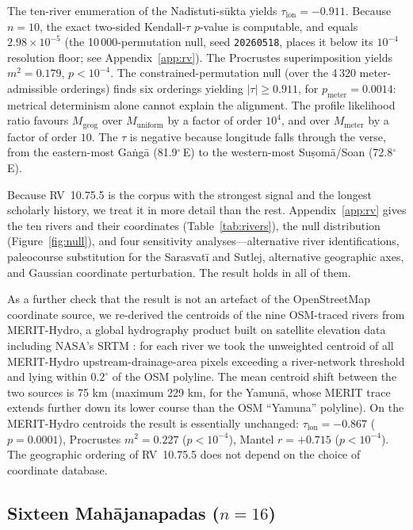 \documentclass[11pt]{article}
\begin{document}
The ten-river enumeration of the Nadīstuti-sūkta yields
$\tau_\text{lon} = -0.911$. Because $n=10$, the exact two-sided
Kendall-$\tau$ $p$-value is computable, and equals
$2.98\times10^{-5}$ (the 10\,000-permutation null, seed
\texttt{20260518}, places it below its $10^{-4}$ resolution
floor; see Appendix~\ref{app:rv}). The Procrustes
superimposition yields $m^2 = 0.179$, $p < 10^{-4}$. The
constrained-permutation null (over the 4\,320 meter-admissible
orderings) finds six orderings yielding $|\tau| \geq 0.911$, for
$p_\text{meter} = 0.0014$: metrical determinism alone cannot
explain the alignment. The profile likelihood ratio favours
$M_\text{geog}$ over $M_\text{uniform}$ by a factor of order $10^4$,
and over $M_\text{meter}$ by a factor of order $10$. The $\tau$ is negative because
longitude falls through the verse, from the eastern-most Ga\.{n}g\={a}
(81.9$^\circ$\,E) to the western-most Su\d{s}om\={a}/Soan
(72.8$^\circ$\,E).

Because RV~10.75.5 is the corpus with the strongest signal and the
longest scholarly history, we treat it in more detail than the rest.
Appendix~\ref{app:rv} gives the ten rivers and their coordinates
(Table~\ref{tab:rivers}), the null distribution
(Figure~\ref{fig:null}), and four sensitivity analyses---alternative
river identifications, paleocourse substitution for the Sarasvatī
and Sutlej, alternative geographic axes, and Gaussian coordinate
perturbation. The result holds in all of them.

As a further check that the result is not an artefact of the
OpenStreetMap coordinate source, we re-derived the centroids of the
nine OSM-traced rivers from MERIT-Hydro, a global hydrography product
built on satellite elevation data including NASA's SRTM
\citep{yamazaki2019}: for each river we took the
unweighted centroid of all MERIT-Hydro upstream-drainage-area pixels
exceeding a river-network threshold and lying within $0.2^\circ$ of
the OSM polyline. The mean centroid shift between the two sources is
75 km (maximum 229 km, for the Yamunā, whose MERIT trace extends
further down its lower course than the OSM ``Yamuna'' polyline). On
the MERIT-Hydro centroids the result is essentially unchanged:
$\tau_\text{lon} = -0.867$ ($p = 0.0001$), Procrustes $m^2 = 0.227$
($p < 10^{-4}$), Mantel $r = +0.715$ ($p < 10^{-4}$). The geographic
ordering of RV~10.75.5 does not depend on the choice of coordinate
database.

\subsection{Sixteen Mahājanapadas ($n=16$)}\label{sec:mahaj}
\end{document}

